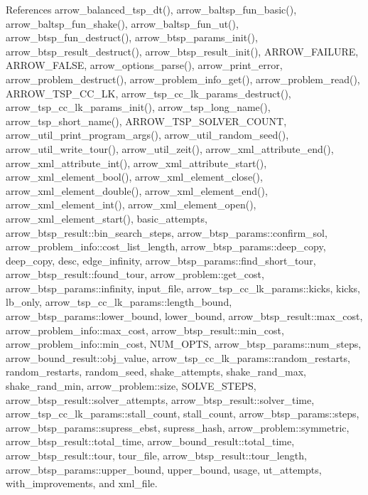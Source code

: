 References arrow\_\-balanced\_\-tsp\_\-dt(), arrow\_\-baltsp\_\-fun\_\-basic(), arrow\_\-baltsp\_\-fun\_\-shake(), arrow\_\-baltsp\_\-fun\_\-ut(), arrow\_\-btsp\_\-fun\_\-destruct(), arrow\_\-btsp\_\-params\_\-init(), arrow\_\-btsp\_\-result\_\-destruct(), arrow\_\-btsp\_\-result\_\-init(), ARROW\_\-FAILURE, ARROW\_\-FALSE, arrow\_\-options\_\-parse(), arrow\_\-print\_\-error, arrow\_\-problem\_\-destruct(), arrow\_\-problem\_\-info\_\-get(), arrow\_\-problem\_\-read(), ARROW\_\-TSP\_\-CC\_\-LK, arrow\_\-tsp\_\-cc\_\-lk\_\-params\_\-destruct(), arrow\_\-tsp\_\-cc\_\-lk\_\-params\_\-init(), arrow\_\-tsp\_\-long\_\-name(), arrow\_\-tsp\_\-short\_\-name(), ARROW\_\-TSP\_\-SOLVER\_\-COUNT, arrow\_\-util\_\-print\_\-program\_\-args(), arrow\_\-util\_\-random\_\-seed(), arrow\_\-util\_\-write\_\-tour(), arrow\_\-util\_\-zeit(), arrow\_\-xml\_\-attribute\_\-end(), arrow\_\-xml\_\-attribute\_\-int(), arrow\_\-xml\_\-attribute\_\-start(), arrow\_\-xml\_\-element\_\-bool(), arrow\_\-xml\_\-element\_\-close(), arrow\_\-xml\_\-element\_\-double(), arrow\_\-xml\_\-element\_\-end(), arrow\_\-xml\_\-element\_\-int(), arrow\_\-xml\_\-element\_\-open(), arrow\_\-xml\_\-element\_\-start(), basic\_\-attempts, arrow\_\-btsp\_\-result::bin\_\-search\_\-steps, arrow\_\-btsp\_\-params::confirm\_\-sol, arrow\_\-problem\_\-info::cost\_\-list\_\-length, arrow\_\-btsp\_\-params::deep\_\-copy, deep\_\-copy, desc, edge\_\-infinity, arrow\_\-btsp\_\-params::find\_\-short\_\-tour, arrow\_\-btsp\_\-result::found\_\-tour, arrow\_\-problem::get\_\-cost, arrow\_\-btsp\_\-params::infinity, input\_\-file, arrow\_\-tsp\_\-cc\_\-lk\_\-params::kicks, kicks, lb\_\-only, arrow\_\-tsp\_\-cc\_\-lk\_\-params::length\_\-bound, arrow\_\-btsp\_\-params::lower\_\-bound, lower\_\-bound, arrow\_\-btsp\_\-result::max\_\-cost, arrow\_\-problem\_\-info::max\_\-cost, arrow\_\-btsp\_\-result::min\_\-cost, arrow\_\-problem\_\-info::min\_\-cost, NUM\_\-OPTS, arrow\_\-btsp\_\-params::num\_\-steps, arrow\_\-bound\_\-result::obj\_\-value, arrow\_\-tsp\_\-cc\_\-lk\_\-params::random\_\-restarts, random\_\-restarts, random\_\-seed, shake\_\-attempts, shake\_\-rand\_\-max, shake\_\-rand\_\-min, arrow\_\-problem::size, SOLVE\_\-STEPS, arrow\_\-btsp\_\-result::solver\_\-attempts, arrow\_\-btsp\_\-result::solver\_\-time, arrow\_\-tsp\_\-cc\_\-lk\_\-params::stall\_\-count, stall\_\-count, arrow\_\-btsp\_\-params::steps, arrow\_\-btsp\_\-params::supress\_\-ebst, supress\_\-hash, arrow\_\-problem::symmetric, arrow\_\-btsp\_\-result::total\_\-time, arrow\_\-bound\_\-result::total\_\-time, arrow\_\-btsp\_\-result::tour, tour\_\-file, arrow\_\-btsp\_\-result::tour\_\-length, arrow\_\-btsp\_\-params::upper\_\-bound, upper\_\-bound, usage, ut\_\-attempts, with\_\-improvements, and xml\_\-file.

